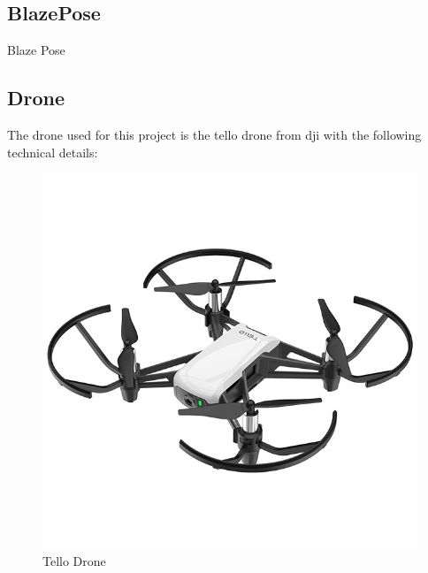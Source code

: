 \documentclass[a4paper,11pt,singlespacing]{article}
\begin{document}
\subsection{BlazePose}
Blaze Pose \cite{BLP_GITHUB} \cite{DBLP:journals/corr/abs-2006-10204} %

\subsection{Drone}

The drone used for this project is the tello drone from dji with the following technical details:

\begin{figure}[h!]
	\centering
	\includegraphics[scale=0.5]{images/tello_front.jpeg}
	\caption{Tello Drone}
	\label{tello_drone}
\end{figure}
\end{document}
